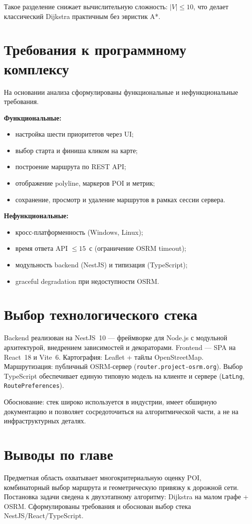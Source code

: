 Такое разделение снижает вычислительную сложность: $|V| \leq 10$, что делает
классический Dijkstra практичным без эвристик A*.

\section{Требования к программному комплексу}

На основании анализа сформулированы функциональные и нефункциональные требования.

\textbf{Функциональные:}
\begin{itemize}
  \item настройка шести приоритетов через UI;
  \item выбор старта и финиша кликом на карте;
  \item построение маршрута по REST API;
  \item отображение polyline, маркеров POI и метрик;
  \item сохранение, просмотр и удаление маршрутов в рамках сессии сервера.
\end{itemize}

\textbf{Нефункциональные:}
\begin{itemize}
  \item кросс-платформенность (Windows, Linux);
  \item время ответа API $\leq 15$~с (ограничение OSRM timeout);
  \item модульность backend (NestJS) и типизация (TypeScript);
  \item graceful degradation при недоступности OSRM.
\end{itemize}

\section{Выбор технологического стека}

Backend реализован на NestJS~10 --- фреймворке для Node.js с модульной архитектурой,
внедрением зависимостей и декораторами. Frontend --- SPA на React~18 и Vite~6.
Картография: Leaflet + тайлы OpenStreetMap. Маршрутизация: публичный OSRM-сервер
(\texttt{router.project-osrm.org}). Выбор TypeScript обеспечивает единую типовую
модель на клиенте и сервере (\texttt{LatLng}, \texttt{RoutePreferences}).

Обоснование: стек широко используется в индустрии, имеет обширную документацию и
позволяет сосредоточиться на алгоритмической части, а не на инфраструктурных
деталях.

\section{Выводы по главе}

Предметная область охватывает многокритериальную оценку POI, комбинаторный выбор
маршрута и геометрическую привязку к дорожной сети. Постановка задачи сведена к
двухэтапному алгоритму: Dijkstra на малом графе + OSRM. Сформулированы требования
и обоснован выбор стека NestJS/React/TypeScript.
